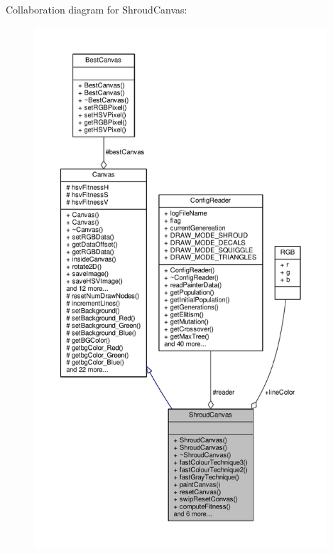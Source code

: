 Collaboration diagram for Shroud\+Canvas\+:
\nopagebreak
\begin{figure}[H]
\begin{center}
\leavevmode
\includegraphics[height=550pt]{classShroudCanvas__coll__graph}
\end{center}
\end{figure}
